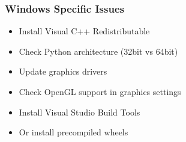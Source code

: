\documentclass[a4paper,10pt,english,openany,oneside]{sphinxmanual}
\begin{document}
\subsubsection{Windows Specific Issues}
\label{\detokenize{legacy_examples:windows-specific-issues}}\begin{description}
\begin{itemize}
\item {} 
\sphinxAtStartPar
Install Visual C++ Redistributable

\item {} 
\sphinxAtStartPar
Check Python architecture (32\sphinxhyphen{}bit vs 64\sphinxhyphen{}bit)

\end{itemize}

\begin{itemize}
\item {} 
\sphinxAtStartPar
Update graphics drivers

\item {} 
\sphinxAtStartPar
Check OpenGL support in graphics settings

\end{itemize}

\begin{itemize}
\item {} 
\sphinxAtStartPar
Install Visual Studio Build Tools

\item {} 
\sphinxAtStartPar
Or install pre\sphinxhyphen{}compiled wheels

\end{itemize}

\end{description}
\end{document}
